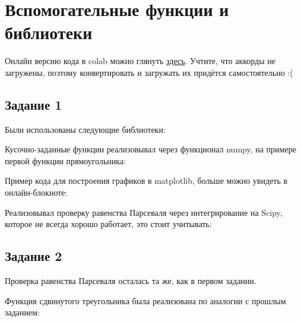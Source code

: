 \chapter{Вспомогательные функции и библиотеки}
\label{ch:chap1}



\lstset{style=mystyle}

Онлайн версию кода в colab можно глянуть \href{https://colab.research.google.com/drive/18OXQjzdn8iWHcQShWfElPcsidweJTsYt?usp=sharing}{здесь}. 
Учтите, что аккорды не загружены, поэтому конвертировать и загружать их придётся самостоятельно :(
\section{Задание 1}
Были использованы следующие библиотеки:

Кусочно-заданные функции реализовывал через функционал numpy, на примере первой функции прямоугольника:

Пример кода для построения графиков в matplotlib, больше можно увидеть в онлайн-блокноте:

Реализовывал проверку равенства Парсеваля через интегрирование на Scipy, которое не всегда хорошо работает, это стоит учитывать:


\section{Задание 2}

Проверка равенства Парсеваля осталась та же, как в первом задании.

Функция сдвинутого треугольника была реализована по аналогии с прошлым заданием:


